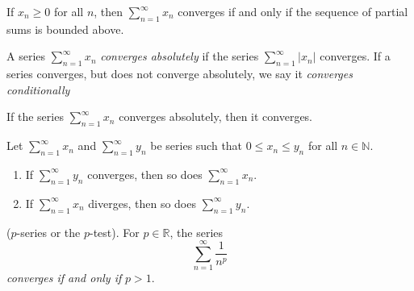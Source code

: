 \documentclass[../main.tex]{subfiles}
\begin{document}
    
    
    \begin{proposition}
    If $x_n \geq 0$ for all $n$, then $\sum_{n=1}^{\infty} x_n$ converges if and only if the sequence of partial sums is bounded above.
    \end{proposition}
    
    
    
    
    
    \begin{definition}\label{def:absolute_Convergence_series}
    A series $\sum_{n=1}^{\infty} x_n$ \textit{converges absolutely} if the series $\sum_{n=1}^{\infty} |x_n|$ converges. If a series converges, but does not converge absolutely, we say it \textit{converges conditionally}
    \end{definition}
    
    
    
    
    \begin{proposition}
    If the series $\sum_{n=1}^{\infty} x_n$ converges absolutely, then it converges.
    \end{proposition}
    
    
    
    
    
    \begin{proposition}\label{prp:comparison_test_series}
    Let $\sum_{n=1}^{\infty} x_n$ and $\sum_{n=1}^{\infty} y_n$ be series such that $0 \leq x_n \leq y_n$ for all $n \in \mathbb{N}$.
    \begin{enumerate}
        \item If $\sum_{n=1}^{\infty} y_n$ converges, then so does $\sum_{n=1}^{\infty} x_n$.
        \item If $\sum_{n=1}^{\infty} x_n$ diverges, then so does $\sum_{n=1}^{\infty} y_n$.
    \end{enumerate}
    \end{proposition}
    
    
    
    
    
    
    \begin{proposition}[P-Series]\label{prp:p-series}
    ($p$-series or the $p$-test). For $p \in \mathbb{R}$, the series
    \[
    \sum_{n=1}^{\infty} \frac{1}{n^p}
    \]
    \textit{converges if and only if} $p > 1$.
    
    \end{proposition}
    
    
    
\end{document}
